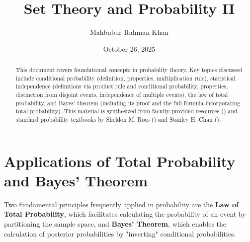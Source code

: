 \documentclass[12pt, a4paper]{article}
\theoremstyle{definition}
\theoremstyle{plain}
\begin{document}
\onehalfspacing %

\title{Set Theory and Probability II}
\author{Mahbubur Rahman Khan}
\date{October 26, 2025}
\maketitle

\begin{abstract}
    This document covers foundational concepts in probability theory. Key topics discussed include conditional probability (definition, properties, multiplication rule), statistical independence (definitions via product rule and conditional probability, properties, distinction from disjoint events, independence of multiple events), the law of total probability, and Bayes' theorem (including its proof and the full formula incorporating total probability). This material is synthesized from faculty-provided resources (\cite{FacultyNotes}) and standard probability textbooks by Sheldon M. Ross (\cite{Ross}) and Stanley H. Chan (\cite{Chan}).
\end{abstract}

\tableofcontents
\newpage

\section{Applications of Total Probability and Bayes' Theorem}

Two fundamental principles frequently applied in probability are the \textbf{Law of Total Probability}, which facilitates calculating the probability of an event by partitioning the sample space, and \textbf{Bayes' Theorem}, which enables the calculation of posterior probabilities by "inverting" conditional probabilities.
\end{document}
